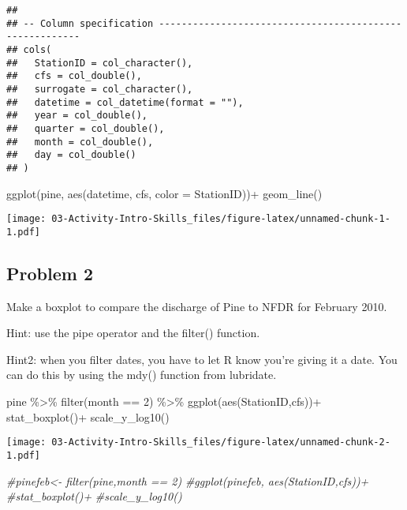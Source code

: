 \documentclass[
]{article}
\newenvironment{Shaded}{\begin{snugshade}}{\end{snugshade}}
\newcommand{\AttributeTok}[1]{\textcolor[rgb]{0.77,0.63,0.00}{#1}}
\newcommand{\CommentTok}[1]{\textcolor[rgb]{0.56,0.35,0.01}{\textit{#1}}}
\newcommand{\DecValTok}[1]{\textcolor[rgb]{0.00,0.00,0.81}{#1}}
\newcommand{\FunctionTok}[1]{\textcolor[rgb]{0.00,0.00,0.00}{#1}}
\newcommand{\NormalTok}[1]{#1}
\newcommand{\SpecialCharTok}[1]{\textcolor[rgb]{0.00,0.00,0.00}{#1}}
\begin{document}
\begin{verbatim}
## 
## -- Column specification --------------------------------------------------------
## cols(
##   StationID = col_character(),
##   cfs = col_double(),
##   surrogate = col_character(),
##   datetime = col_datetime(format = ""),
##   year = col_double(),
##   quarter = col_double(),
##   month = col_double(),
##   day = col_double()
## )
\end{verbatim}

\begin{Shaded}
\begin{Highlighting}[]
\FunctionTok{ggplot}\NormalTok{(pine, }\FunctionTok{aes}\NormalTok{(datetime, cfs, }\AttributeTok{color =}\NormalTok{ StationID))}\SpecialCharTok{+}
  \FunctionTok{geom\_line}\NormalTok{()}
\end{Highlighting}
\end{Shaded}

\texttt{[image: 03-Activity-Intro-Skills\_files/figure-latex/unnamed-chunk-1-1.pdf]}

\hypertarget{problem-2}{%
\subsection{Problem 2}\label{problem-2}}

Make a boxplot to compare the discharge of Pine to NFDR for February
2010.

Hint: use the pipe operator and the filter() function.

Hint2: when you filter dates, you have to let R know you're giving it a
date. You can do this by using the mdy() function from lubridate.

\begin{Shaded}
\begin{Highlighting}[]
\NormalTok{pine }\SpecialCharTok{\%\textgreater{}\%}
  \FunctionTok{filter}\NormalTok{(month }\SpecialCharTok{==} \DecValTok{2}\NormalTok{) }\SpecialCharTok{\%\textgreater{}\%}
  \FunctionTok{ggplot}\NormalTok{(}\FunctionTok{aes}\NormalTok{(StationID,cfs))}\SpecialCharTok{+}
  \FunctionTok{stat\_boxplot}\NormalTok{()}\SpecialCharTok{+}
  \FunctionTok{scale\_y\_log10}\NormalTok{()}
\end{Highlighting}
\end{Shaded}

\texttt{[image: 03-Activity-Intro-Skills\_files/figure-latex/unnamed-chunk-2-1.pdf]}

\begin{Shaded}
\begin{Highlighting}[]
\CommentTok{\#pinefeb\textless{}{-} filter(pine,month == 2)}
\CommentTok{\#ggplot(pinefeb, aes(StationID,cfs))+}
  \CommentTok{\#stat\_boxplot()+}
  \CommentTok{\#scale\_y\_log10()}
\end{Highlighting}
\end{Shaded}
\end{document}
